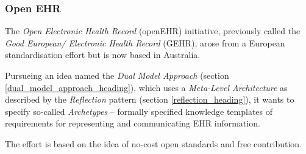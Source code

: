 %
%
%
%
%
%
%

\subsubsection{Open EHR}
\label{open_ehr_heading}

The \emph{Open Electronic Health Record} (openEHR) \cite{openehr} initiative,
previously called the \emph{Good European/ Electronic Health Record} (GEHR),
arose from a European standardisation effort but is now based in Australia.

Pursueing an idea named the \emph{Dual Model Approach} (section
\ref{dual_model_approach_heading}), which uses a \emph{Meta-Level Architecture}
as described by the \emph{Reflection} pattern (section \ref{reflection_heading}),
it wants to specify so-called \emph{Archetypes} -- formally specified knowledge
templates of requirements for representing and communicating EHR information.

The effort is based on the idea of no-cost open standards and free contribution.
